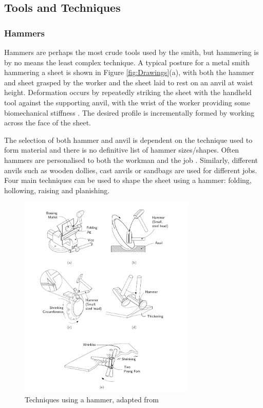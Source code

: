 \subsection{Tools and Techniques} \label{sec:ManualTech}
\subsubsection{Hammers} \label{sec:ManualHammer}

Hammers are perhaps the most crude tools used by the smith, but hammering is by no means the least complex technique. A typical posture for a metal smith hammering a sheet is shown in Figure \ref{fig:Drawings}(a), with both the hammer and sheet grasped by the worker and the sheet laid to rest on an anvil at waist height. Deformation occurs by repeatedly striking the sheet with the handheld tool against the supporting anvil, with the wrist of the worker providing some biomechanical stiffness \citep{Phan2020EstimatingTask}. The desired profile is incrementally formed by working across the face of the sheet.

The selection of both hammer and anvil is dependent on the technique used to form material and there is no definitive list of hammer sizes/shapes. Often hammers are personalised to both the workman and the job \citep{Barr2013ProfessionalFabrication}. Similarly, different anvils such as wooden dollies, cast anvils or sandbags are used for different jobs. Four main techniques can be used to shape the sheet using a hammer: folding, hollowing, raising and planishing.

\begin{figure}[h]
    \centering
    \includegraphics[width=0.75\textwidth]{Images/HammeringTechDrawing.pdf}
    \caption{Techniques using a hammer, adapted from \citep{Timings2008SheetMetalwork}}
    \label{fig:hammertech}
\end{figure}

